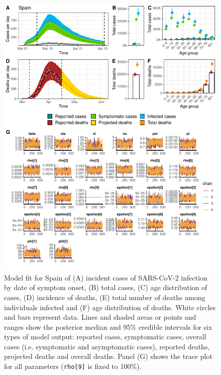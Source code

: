 \documentclass{article}
\begin{document}
\begin{figure}[h]
	\centering
	\includegraphics[width=\linewidth]{../format_output/figures_v3/supp_fit_spain.pdf}
	\caption{Model fit for Spain of (A) incident cases of SARS-CoV-2 infection by date of symptom onset, (B) total cases, (C) age distribution of cases, (D) incidence of deaths, (E) total number of deaths among individuals infected and (F) age distribution of deaths. White circles and bars represent data. Lines and shaded areas or points and ranges show the posterior median and 95\% credible intervals for six types of model output: reported cases, symptomatic cases, overall cases (i.e. symptomatic and asymptomatic cases), reported deaths, projected deaths and overall deaths. Panel (G) shows the trace plot for all parameters (\texttt{rho[9]} is fixed to 100\%).}

\end{figure}
\end{document}
